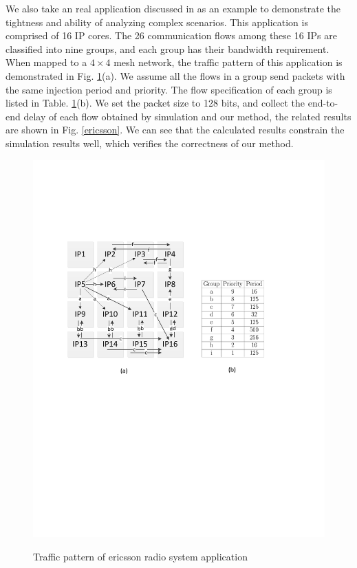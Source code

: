 \documentclass[preprint]{elsarticle}
\begin{document}
We also take an real application discussed in \cite{LuJa08}\cite{Jafari1922089} as an example to demonstrate the tightness and ability of analyzing complex scenarios. This application is comprised of 16 IP cores. The 26 communication flows among these 16 IPs are classified into nine groups, and each group has their bandwidth requirement. When mapped to a $4\times 4$ mesh network, the traffic pattern of this application is demonstrated in Fig. \ref{trafficpattern}(a). We assume all the flows in a group send packets with the same injection period and priority. The flow specification of each group is listed in Table. \ref{trafficpattern}(b). We set the packet size to 128 bits, and collect the end-to-end delay of each flow obtained by simulation and our method, the related results are shown in Fig. \ref{ericsson}. We can see that the calculated results constrain the simulation results well, which verifies the correctness of our method.
\begin{figure}
  \centering
  \includegraphics[scale=0.7]{figures/trafficpattern.pdf}\\
  \caption{Traffic pattern of ericsson radio system application}\label{trafficpattern}
\end{figure}
\end{document}
